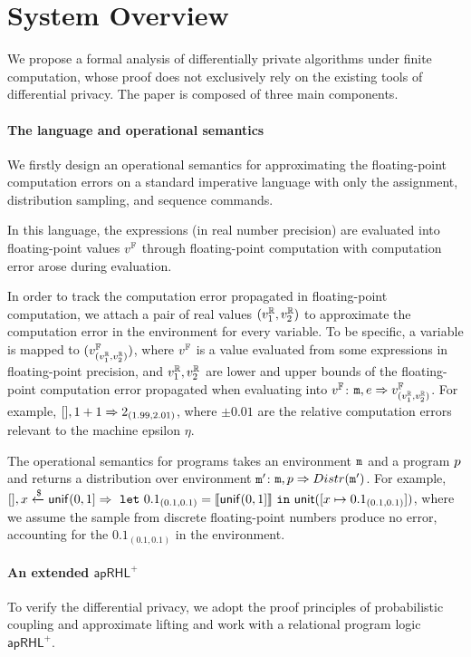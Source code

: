 \documentclass[a4paper,11pt]{article}
\begin{document}
\section{System Overview}
We propose a formal analysis of differentially private algorithms under finite computation, whose proof does not exclusively rely on the existing tools of differential privacy. The paper is composed of three main components.
%
\paragraph{The language and operational semantics}
We firstly design an operational semantics for approximating the floating-point computation errors on a standard imperative language with only the assignment, distribution sampling, and sequence commands.

In this language, the expressions (in real number precision) are evaluated into floating-point values $v^{\mathbb{F}}$ through floating-point computation with computation error arose during evaluation. 

In order to track the computation error propagated in floating-point computation, we attach a pair of real values $(v^{\mathbb{R}}_1, v^{\mathbb{R}}_2)$ to approximate the computation error in the environment for every variable. 
To be specific,
a variable is mapped to $(v^{\mathbb{F}}_{(v^{\mathbb{R}}_1, v^{\mathbb{R}}_2)})$, where $v^{\mathbb{F}}$ is a value evaluated from some expressions in floating-point precision,
and $v^{\mathbb{R}}_1, v^{\mathbb{R}}_2$ are lower and upper bounds of the floating-point computation error propagated when evaluating into $v^{\mathbb{F}}$: 
$\mathtt{m}, e \Rightarrow v^{\mathbb{F}}_{(v^{\mathbb{R}}_1, v^{\mathbb{R}}_2)}$.
%
For example, $[], 1 + 1 \Rightarrow 2_{(1.99, 2.01)}$, where $\pm 0.01$ are the relative computation errors relevant to the machine epsilon $\eta$.

The operational semantics for programs takes an environment $\mathtt{m}$ and a program $p$ and returns a distribution over environment $\mathtt{m}'$: $\mathtt{m}, p \Rightarrow Distr(\mathtt{m}')$. 
For example, $[], x \xleftarrow{\$} \mathsf{unif}(0,1] \Rightarrow 
~\mathtt{let}~ 0.1_{(0.1, 0.1)} = \llbracket \mathsf{unif}(0,1] \rrbracket ~\mathtt{in}~ \mathsf{unit}([x \mapsto 0.1_{(0.1, 0.1)}])$, 
where we assume the sample from discrete floating-point numbers produce no error, accounting for the $0.1_{(0.1, 0.1)}$ in the environment.

%
\paragraph{An extended $\mathsf{apRHL}^+$} 
To verify the differential privacy, we adopt the proof principles of probabilistic coupling and approximate lifting and work with a relational program logic
$\mathsf{apRHL}^+$.
\end{document}
